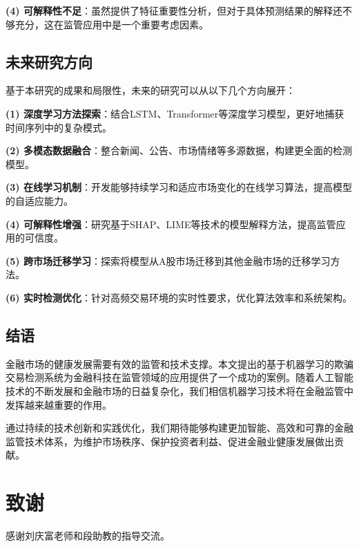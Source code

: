 \documentclass[12pt,a4paper]{article}
\begin{document}
\textbf{(4) 可解释性不足}：虽然提供了特征重要性分析，但对于具体预测结果的解释还不够充分，这在监管应用中是一个重要考虑因素。

\subsection{未来研究方向}

基于本研究的成果和局限性，未来的研究可以从以下几个方向展开：

\textbf{(1) 深度学习方法探索}：结合LSTM、Transformer等深度学习模型，更好地捕获时间序列中的复杂模式。

\textbf{(2) 多模态数据融合}：整合新闻、公告、市场情绪等多源数据，构建更全面的检测模型。

\textbf{(3) 在线学习机制}：开发能够持续学习和适应市场变化的在线学习算法，提高模型的自适应能力。

\textbf{(4) 可解释性增强}：研究基于SHAP、LIME等技术的模型解释方法，提高监管应用的可信度。

\textbf{(5) 跨市场迁移学习}：探索将模型从A股市场迁移到其他金融市场的迁移学习方法。

\textbf{(6) 实时检测优化}：针对高频交易环境的实时性要求，优化算法效率和系统架构。

\subsection{结语}

金融市场的健康发展需要有效的监管和技术支撑。本文提出的基于机器学习的欺骗交易检测系统为金融科技在监管领域的应用提供了一个成功的案例。随着人工智能技术的不断发展和金融市场的日益复杂化，我们相信机器学习技术将在金融监管中发挥越来越重要的作用。

通过持续的技术创新和实践优化，我们期待能够构建更加智能、高效和可靠的金融监管技术体系，为维护市场秩序、保护投资者利益、促进金融业健康发展做出贡献。

\section*{致谢}

感谢刘庆富老师和段助教的指导交流。
\end{document}
